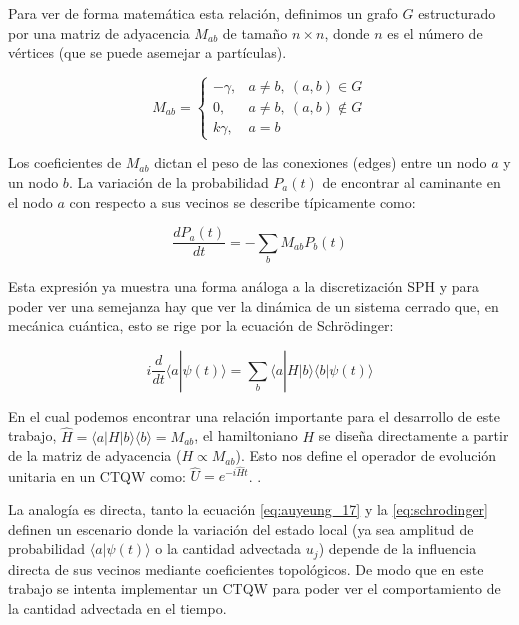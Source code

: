 Para ver de forma matemática esta relación, definimos un grafo $G$ estructurado por una matriz de adyacencia $M_{ab}$ de tamaño $n \times n$, donde $n$ es el número de vértices (que se puede asemejar a partículas).

\begin{equation}
    M_{ab} = 
    \begin{cases} 
        -\gamma, & a \neq b, \ (a,b) \in G \\
        0, & a \neq b, \ (a,b) \notin G \\
        k\gamma, & a = b
    \end{cases}
    \label{eq:matriz_Mab}
\end{equation}

Los coeficientes de $M_{ab}$ dictan el peso de las conexiones (edges) entre un nodo $a$ y un nodo $b$. La variación de la probabilidad $P_a(t)$ de encontrar al caminante en el nodo $a$ con respecto a sus vecinos se describe típicamente como:

\begin{equation}
    \frac{d P_a(t)}{dt} = - \sum_b M_{ab} P_b(t)
    \label{eq:prob_variation}
\end{equation}

Esta expresión ya muestra una forma análoga a la discretización SPH y para poder ver una semejanza hay que ver la dinámica de un sistema cerrado que, en mecánica cuántica, esto se rige por la ecuación de Schrödinger:

\begin{equation}
    i \frac{d}{dt} \langle a | \psi(t) \rangle = \sum_b \langle a | H | b \rangle \langle b | \psi(t) \rangle
    \label{eq:schrodinger}
\end{equation}

En el cual podemos encontrar una relación importante para el desarrollo de este trabajo, $\hat{H} = \langle a | H | b \rangle \langle b \rangle = M_{ab}$, el hamiltoniano $H$ se diseña directamente a partir de la matriz de adyacencia ($H \propto M_{ab}$). Esto nos define el operador de evolución unitaria en un CTQW como: $\hat{U} = e^{-i\hat{H}t}$. \cite{VenegasAndraca2012}. 

La analogía es directa, tanto la ecuación \eqref{eq:auyeung_17} y la \eqref{eq:schrodinger} definen un escenario donde la variación del estado local (ya sea amplitud de probabilidad $\langle a | \psi(t) \rangle$ o la cantidad advectada $u_j$) depende de la influencia directa de sus vecinos mediante coeficientes topológicos. De modo que en este trabajo se intenta implementar un CTQW para poder ver el comportamiento de la cantidad advectada en el tiempo. 

